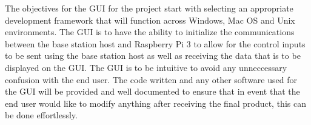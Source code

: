 The objectives for the GUI for the project start with selecting an appropriate development framework that will function across Windows, Mac OS and Unix environments.  The GUI is to have the ability to initialize the communications between the base station host and Raspberry Pi 3 to allow for the control inputs to be sent using the base station host as well as receiving the data that is to be displayed on the GUI. The GUI is to be intuitive to avoid any unneccessary confusion with the end user. The code written and any other software used for the GUI will be provided and well documented to ensure that in event that the end user would like to modify anything after receiving the final product, this can be done effortlessly. 
  
